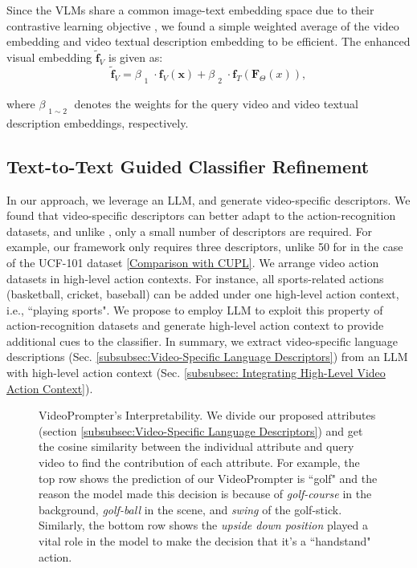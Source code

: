 \documentclass{article} \usepackage{iclr2024_conference,times}
\begin{document}
Since the VLMs share a common image-text embedding space due to their contrastive learning objective \citep{radford2021learning}, we found a simple weighted average of the video embedding and video textual description embedding to be efficient. The enhanced visual embedding $\bm{\tilde{f}}_V$ is given as:
\begin{equation}
    \bm{\tilde{f}}_V = \beta_{\substack{1}} \cdot \bm{f}_{V}(\bm{x}) + \beta_{\substack{2}} \cdot \bm{f}_{T}\left(\bm{F}_{\Theta}(x)\right),
\end{equation}



where \(\beta_{\substack{1\sim 2}}\) denotes the weights for the query video and video textual description embeddings, respectively.  




\subsection{Text-to-Text Guided Classifier Refinement}


In our approach, we leverage an LLM, \citep{brown2020language} and generate video-specific descriptors. We found that video-specific descriptors can better adapt to the action-recognition datasets, and unlike \citep{pratt2022does}, only a small number of descriptors are required. For example, our framework only requires three descriptors, unlike 50 for \citep{pratt2022does} in the case of the UCF-101 dataset \citep{soomro2012ucf101} \ref{Comparison with CUPL}.
We arrange video action datasets in high-level action contexts.
For instance, all sports-related actions (basketball, cricket, baseball) can be added under one high-level action context, i.e., ``playing sports". We propose to employ LLM to exploit this property of action-recognition datasets and generate high-level action context to provide additional cues to the classifier. In summary, we extract video-specific language descriptions (Sec. \ref{subsubsec:Video-Specific Language Descriptors}) from an LLM with high-level action context (Sec. \ref{subsubsec: Integrating High-Level Video Action Context}). 

\begin{figure}[!t]
\caption{VideoPrompter's Interpretability. We divide our proposed attributes (section \ref{subsubsec:Video-Specific Language Descriptors}) and get the cosine similarity between the individual attribute and query video to find the contribution of each attribute. For example, the top row shows the prediction of our VideoPrompter is ``golf" and the reason the model made this decision is because of \emph{golf-course} in the background, \emph{golf-ball} in the scene, and \emph{swing} of the golf-stick. Similarly, the bottom row shows the \emph{upside down position} played a vital role in the model to make the decision that it's a ``handstand" action.}
    \label{fig:VideoPromper's Interoperability}
    \vspace{-1em}
\end{figure}
\end{document}
